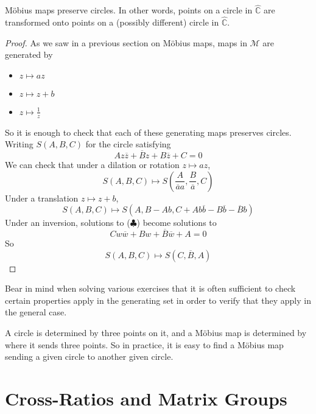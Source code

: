 \documentclass{article}
\begin{document}
	\begin{theorem}
		M\"obius maps preserve circles. In other words, points on a circle in $\hat{\mathbb C}$ are transformed onto points on a (possibly different) circle in $\hat{\mathbb C}$.
	\end{theorem}
	\begin{proof}
		As we saw in a previous section on M\"obius maps, maps in $\mathcal M$ are generated by
		\begin{itemize}
			\item $z \mapsto az$
			\item $z \mapsto z + b$
			\item $z \mapsto \frac{1}{z}$
		\end{itemize}
		So it is enough to check that each of these generating maps preserves circles. Writing $S(A, B, C)$ for the circle satisfying
		\[ Az\overline z + \overline B z + B \overline z + C = 0 \tag{$\clubsuit$} \]
		We can check that under a dilation or rotation $z \mapsto az$,
		\[ S(A, B, C) \mapsto S\left( \frac{A}{\overline a a}, \frac{B}{\overline a}, C \right) \]
		Under a translation $z \mapsto z + b$,
		\[ S(A, B, C) \mapsto S\left( A, B-Ab, C+Ab\overline b - B\overline b - \overline B b \right) \]
		Under an inversion, solutions to ($\clubsuit$) become solutions to
		\[ Cw\overline w + Bw + \overline B\overline w + A = 0 \]
		So
		\[ S(A, B, C) \mapsto S(C, \overline B, A) \]
	\end{proof}
	Bear in mind when solving various exercises that it is often sufficient to check certain properties apply in the generating set in order to verify that they apply in the general case.

	\begin{remark}
		A circle is determined by three points on it, and a M\"obius map is determined by where it sends three points. So in practice, it is easy to find a M\"obius map sending a given circle to another given circle.
	\end{remark}

	\section{Cross-Ratios and Matrix Groups}
\end{document}
